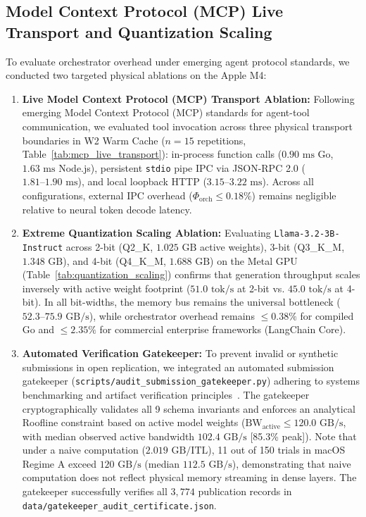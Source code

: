 \documentclass[11pt,a4paper]{article}
\begin{document}
\subsection{Model Context Protocol (MCP) Live Transport and Quantization Scaling}
\label{sec:mcp_and_quant}
To evaluate orchestrator overhead under emerging agent protocol standards, we conducted two targeted physical ablations on the Apple M4:
\begin{enumerate}
    \item \textbf{Live Model Context Protocol (MCP) Transport Ablation:} Following emerging Model Context Protocol (MCP) standards for agent-tool communication, we evaluated tool invocation across three physical transport boundaries in W2 Warm Cache ($n=15$ repetitions, Table~\ref{tab:mcp_live_transport}): in-process function calls ($0.90\text{ ms}$ Go, $1.63\text{ ms}$ Node.js), persistent \texttt{stdio} pipe IPC via JSON-RPC 2.0 ($1.81\text{--}1.90\text{ ms}$), and local loopback HTTP ($3.15\text{--}3.22\text{ ms}$). Across all configurations, external IPC overhead ($\Phi_{\text{orch}} \le 0.18\%$) remains negligible relative to neural token decode latency.
    \item \textbf{Extreme Quantization Scaling Ablation:} Evaluating \texttt{Llama-3.2-3B-Instruct} across 2-bit (Q2\_K, $1.025\text{ GB}$ active weights), 3-bit (Q3\_K\_M, $1.348\text{ GB}$), and 4-bit (Q4\_K\_M, $1.688\text{ GB}$) on the Metal GPU (Table~\ref{tab:quantization_scaling}) confirms that generation throughput scales inversely with active weight footprint ($51.0\text{ tok/s}$ at 2-bit vs. $45.0\text{ tok/s}$ at 4-bit). In all bit-widths, the memory bus remains the universal bottleneck ($52.3\text{--}75.9\text{ GB/s}$), while orchestrator overhead remains $\le 0.38\%$ for compiled Go and $\le 2.35\%$ for commercial enterprise frameworks (LangChain Core).
    \item \textbf{Automated Verification Gatekeeper:} To prevent invalid or synthetic submissions in open replication, we integrated an automated submission gatekeeper (\texttt{scripts/audit\_submission\_gatekeeper.py}) adhering to systems benchmarking and artifact verification principles~\cite{kalibera2013rigorous, hoefler2015scientific}. The gatekeeper cryptographically validates all 9 schema invariants and enforces an analytical Roofline constraint based on active model weights ($\text{BW}_{\text{active}} \le 120.0\text{ GB/s}$, with median observed active bandwidth $102.4\text{ GB/s}$ [85.3\% peak]). Note that under a naive computation ($2.019\text{ GB} / \text{ITL}$), 11 out of 150 trials in macOS Regime A exceed $120\text{ GB/s}$ (median $112.5\text{ GB/s}$), demonstrating that naive computation does not reflect physical memory streaming in dense layers. The gatekeeper successfully verifies all $3{,}774$ publication records in \texttt{data/gatekeeper\_audit\_certificate.json}.
\end{enumerate}
\end{document}
